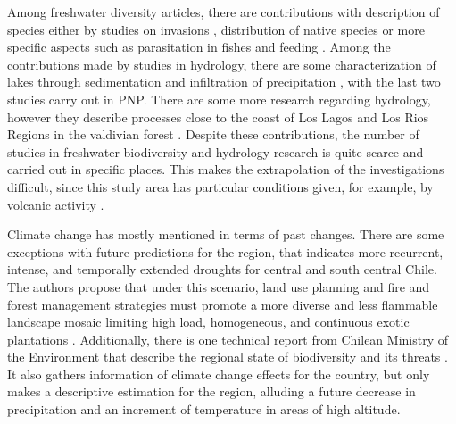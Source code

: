 \documentclass[]{article}
\begin{document}
Among freshwater diversity articles, there are contributions with description of species either by studies on invasions \citep{Urrutia2017invasive, Esse2018spectral, Fuentes2019lakes}, distribution of native species \citep{Zapata2008Protozoa, Unmack2009hatcheria} or more specific aspects such as parasitation in fishes \citep{GeorgeNascimento2009} and feeding \citep{Beltran2012dietary}. Among the contributions made by studies in hydrology, there are some characterization of lakes through sedimentation \citetext{\citealp[organic matter preserved in a lake and its watershed:][]{Bertrand2010bulk}; \citealp[environmental impacts associated with increasing industrial activities and land degradation:][]{Fagel2010geochemical}} and infiltration of precipitation \citetext{\citealp[hydrochemical fluxes in a Nothofagus pumilio forest:][]{Godoy1999Hydrochemical}; \citealp[chemical composition of bulk precipitation:][]{Godoy2001precip}}, with the last two studies carry out in PNP. There are some more research regarding hydrology, however they describe processes close to the coast of Los Lagos and Los Rios Regions in the valdivian forest \citep{LittleWatershed}. Despite these contributions, the number of studies in freshwater biodiversity and hydrology research is quite scarce and carried out in specific places. This makes the extrapolation of the investigations difficult, since this study area has particular conditions given, for example, by volcanic activity \citep{Walter2016volcanic}.

Climate change has mostly mentioned in terms of past changes. There are some exceptions with future predictions for the region, that indicates more recurrent, intense, and temporally extended droughts for central and south central Chile. The authors propose that under this scenario, land use planning and fire and forest management strategies must promote a more diverse and less flammable landscape mosaic limiting high load, homogeneous, and continuous exotic plantations \citep{Gonzalez2018Mega}. Additionally, there is one technical report from Chilean Ministry of the Environment that describe the regional state of biodiversity and its threats \citep{MMA2016diagnostico}. It also gathers information of climate change effects for the country, but only makes a descriptive estimation for the region,
alluding a future decrease in precipitation and an increment of temperature in areas of high altitude.
\end{document}
